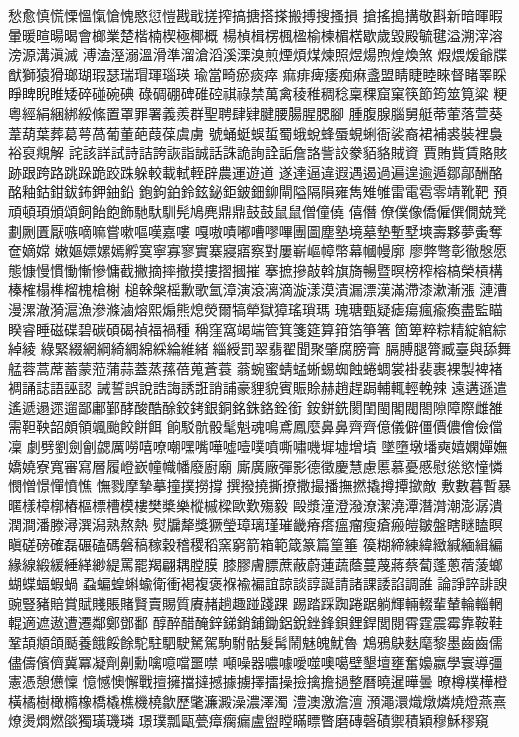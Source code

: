 愁愈慎慌慄慍愾愴愧愍愆愷戡戢搓搾搞搪搭搽搬搏搜搔損
搶搖搗搆敬斟新暗暉暇暈暖暄暘暍會榔業楚楷楠楔極椰概
楊楨楫楞楓楹榆楝楣楛歇歲毀殿毓毽溢溯滓溶滂源溝滇滅
溥溘溼溺溫滑準溜滄滔溪溧溴煎煙煩煤煉照煜煬煦煌煥煞
煆煨煖爺牒猷獅猿猾瑯瑚瑕瑟瑞瑁琿瑙瑛瑜當畸瘀痰瘁
痲痱痺痿痴痳盞盟睛睫睦睞督睹睪睬睜睥睨睢矮碎碰碗碘
碌碉硼碑碓硿祺祿禁萬禽稜稚稠稔稟稞窟窠筷節筠筮筧粱
粳粵經絹綑綁綏絛置罩罪署義羨群聖聘肆肄腱腰腸腥腮腳
腫腹腺腦舅艇蒂葷落萱葵葦葫葉葬葛萼萵葡董葩葭葆虞虜
號蛹蜓蜈蜇蜀蛾蛻蜂蜃蜆蜊衙裟裔裙補裘裝裡裊裕裒覜解
詫該詳試詩詰誇詼詣誠話誅詭詢詮詬詹詻訾詨豢貊貉賊資
賈賄貲賃賂賅跡跟跨路跳跺跪跤跦躲較載軾輊辟農運遊道
遂達逼違遐遇遏過遍遑逾遁鄒鄗酬酪酩釉鈷鉗鈸鈽鉀鈾鉛
鉋鉤鉑鈴鉉鉍鉅鈹鈿鉚閘隘隔隕雍雋雉雊雷電雹零靖靴靶
預頑頓頊頒頌飼飴飽飾馳馱馴髡鳩麂鼎⿍鼓⿎鼠⿏僧僮僥
僖僭僚僕像僑僱僎僩兢凳劃劂匱厭嗾嘀嘛嘗嗽嘔嘆嘉嘍
嘎嗷嘖嘟嘈嘐嗶團圖塵塾境墓墊塹墅塽壽夥夢夤奪奩嫡嫦
嫩嫗嫖嫘嫣孵寞寧寡寥實寨寢寤察對屢嶄嶇幛幣幕幗幔廓
廖弊彆彰徹慇愿態慷慢慣慟慚慘慵截撇摘摔撤摸摟摺摑摧
搴摭摻敲斡旗旖暢暨暝榜榨榕槁榮槓構榛榷榻榫榴槐槍榭
槌榦槃榣歉歌氳漳演滾漓滴漩漾漠漬漏漂漢滿滯漆漱漸漲
漣漕漫漯澈漪滬漁滲滌滷熔熙煽熊熄熒爾犒犖獄獐瑤瑣瑪
瑰瑭甄疑瘧瘍瘋瘉瘓盡監瞄睽睿睡磁碟碧碳碩碣禎福禍種
稱窪窩竭端管箕箋筵算箝箔箏箸箇箄粹粽精綻綰綜綽綾
綠緊綴網綱綺綢綿綵綸維緒緇綬罰翠翡翟聞聚肇腐膀膏
膈膊腿膂臧臺與舔舞艋蓉蒿蓆蓄蒙蒞蒲蒜蓋蒸蓀蓓蒐蒼蓑
蓊蜿蜜蜻蜢蜥蜴蜘蝕蜷蜩裳褂裴裹裸製裨褚裯誦誌語誣認
誡誓誤說誥誨誘誑誚誧豪貍貌賓賑賒赫趙趕跼輔輒輕輓辣
遠遘遜遣遙遞遢遝遛鄙鄘鄞酵酸酷酴鉸銬銀銅銘銖鉻銓銜
銨鉼銑閡閨閩閣閥閤隙障際雌雒需靼鞅韶頗領颯颱餃餅餌
餉駁骯骰髦魁魂鳴鳶鳳麼鼻⿐齊⿑億儀僻僵價儂儈儉儅凜
劇劈劉劍劊勰厲嘮嘻嘹嘲嘿嘴嘩噓噎噗噴嘶嘯嘰墀墟增墳
墜墮墩墦奭嬉嫻嬋嫵嬌嬈寮寬審寫層履嶝嶔幢幟幡廢廚廟
廝廣廠彈影德徵慶慧慮慝慕憂慼慰慫慾憧憐憫憎憬憚憤憔
憮戮摩摯摹撞撲撈撐撰撥撓撕撩撒撮播撫撚撬撙撢撳敵
敷數暮暫暴暱樣樟槨樁樞標槽模樓樊槳樂樅槭樑歐歎殤毅
毆漿潼澄潑潦潔澆潭潛潸潮澎潺潰潤澗潘滕潯潠潟熟熬熱
熨牖犛獎獗瑩璋璃瑾璀畿瘠瘩瘟瘤瘦瘡瘢皚皺盤瞎瞇瞌瞑
瞋磋磅確磊碾磕碼磐稿稼穀稽稷稻窯窮箭箱範箴篆篇篁箠
篌糊締練緯緻緘緬緝編緣線緞緩綞緙緲緹罵罷羯翩耦膛膜
膝膠膚膘蔗蔽蔚蓮蔬蔭蔓蔑蔣蔡蔔蓬蔥蓿蔆螂蝴蝶蝠蝦蝸
蝨蝙蝗蝌蝓衛衝褐複褒褓褕褊誼諒談諄誕請諸課諉諂調誰
論諍誶誹諛豌豎豬賠賞賦賤賬賭賢賣賜質賡赭趟趣踫踐踝
踢踏踩踟踡踞躺輝輛輟輩輦輪輜輞輥適遮遨遭遷鄰鄭鄧鄱
醇醉醋醃鋅銻銷鋪鋤鋁銳銼鋒鋇鋰銲閭閱霄霆震霉靠鞍鞋
鞏頡頫頜颳養餓餒餘駝駐駟駛駑駕駒駙骷髮髯鬧魅魄魷魯
鴆鴉鴃麩麾黎墨⿒齒儒儘儔儐儕冀冪凝劑劓勳噙噫噹噩噤
噸噪器噥噱噯噬噢噶壁墾壇壅奮嬝嬴學寰導彊憲憑憩憊懍
憶憾懊懈戰擅擁擋撻撼據擄擇擂操撿擒擔撾整曆曉暹曄曇
暸樽樸樺橙橫橘樹橄橢橡橋橇樵機橈歙歷氅濂澱澡濃澤濁
澧澳激澹澶澦澠澴熾燉燐燒燈燕熹燎燙燜燃燄獨璜璣璘
璟璞瓢甌甍瘴瘸瘺盧盥瞠瞞瞟瞥磨磚磬磧禦積穎穆穌穋窺
